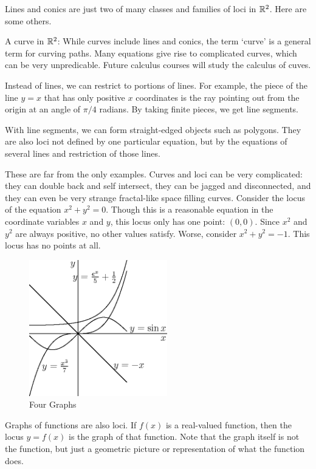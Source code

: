 \documentclass[fleqn]{report}
\begin{document}
Lines and conics are just two of many classes and families of
loci in $\mathbb{R}^2$. Here are some others.
\begin{smallitemize}
\item A curve in $\mathbb{R}^2$: While curves include lines and
conics, the term `curve' is a general term for curving paths.
Many equations give rise to complicated curves, which can 
be very unpredicable. Future calculus courses will study the
calculus of cuves.
\item Instead of lines, we can restrict to portions of lines.
For example, the piece of the line $y=x$ that has only positive
$x$ coordinates is the ray pointing out from the origin at an
angle of $\pi/4$ radians. By taking finite pieces, we get line
segments.
\item With line segments, we can form straight-edged objects
such as polygons. They are also loci not defined by one
particular equation, but by the equations of several lines and
restriction of those lines.
\end{smallitemize}
These are far from the only examples. Curves and loci can be
very complicated: they can double back and self intersect,
they can be jagged and disconnected, and they can even be very
strange fractal-like space filling curves. Consider the locus
of the equation $x^2 + y^2 =0$. Though this is a reasonable
equation in the coordinate variables $x$ and $y$, this locus
only has one point: $(0,0)$. Since $x^2$ and $y^2$ are always
positive, no other values satisfy. Worse, consider $x^2 + y^2
= -1$. This locus has no points at all.

\begin{figure}[t]
\centering
\includegraphics[width=6cm]{figure08.eps}
\caption{Four Graphs}
\label{Four Graphs} 
\end{figure}

Graphs of functions are also loci. If $f(x)$ is a real-valued
function, then the locus $y = f(x)$ is the graph of that
function. Note that the graph itself is not the function, but
just a geometric picture or representation of what the
function does. 
\end{document}
